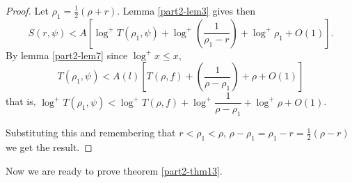 \begin{proof}
Let $\rho_{1}=\frac{1}{2}(\rho+r)$. Lemma \ref{part2-lem3} gives then
$$
S(r,\psi)<A\left[\log^{+}T(\rho_{1},\psi)+\log^{+}\left(\frac{1}{\rho_{1}-r}\right)+\log^{+}\rho_{1}+O(1)\right]. 
$$
By lemma \ref{part2-lem7} since $\log^{+}x\leq x$, 
$$
T(\rho_{1},\psi)<A(l)\left[T(\rho,f)+\left(\frac{1}{\rho-\rho_{1}}\right)+\rho+O(1)\right]
$$\pageoriginale
that is,
$\log^{+}T(\rho_{1},\psi)<\log^{+}T(\rho,f)+\log^{+}\dfrac{1}{\rho-\rho_{1}}+\log^{+}\rho+O(1)$. 

Substituting this and remembering that $r<\rho_{1}<\rho$,
$\rho-\rho_{1}=\rho_{1}-r=\frac{1}{2}(\rho-r)$ we get the result.
\end{proof}

Now we are ready to prove theorem \ref{part2-thm13}.

\subsubsection{}\label{part2-subsubsec2.5.2}


